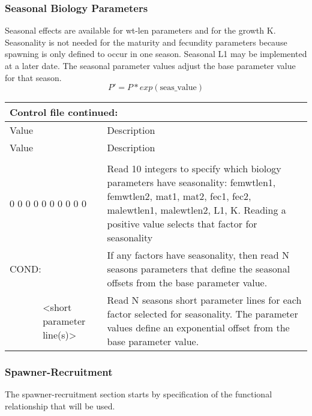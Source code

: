 \subsubsection{Seasonal Biology Parameters}
Seasonal effects are available for wt-len parameters and for the growth K.  Seasonality is not needed for the maturity and fecundity parameters because spawning is only defined to occur in one season.  Seasonal L1 may be implemented at a later date.  The seasonal parameter values adjust the base parameter value for that season.
\begin{equation}
P'=P*exp(\text{seas\_value})
\end{equation}

\begin{center}
	\begin{longtable}{p{0.5cm} p{3.7cm} p{11cm}}
		\multicolumn{3}{l}{Control file continued:}\\
		\hline
		Value & &  Description\\
		\hline
		\endfirsthead
		
		\hline
		Value & &  Description\\
		\hline
		\endhead
		
		\endfoot
		\endlastfoot
		\multicolumn{3}{l}{\#Seasonality for selected biology parameters (not a conditional input)}\\
		\multicolumn{2}{l}{0 0 0 0 0 0 0 0 0 0} & Read 10 integers to specify which biology parameters have seasonality:  femwtlen1, femwtlen2, mat1, mat2, fec1, fec2, malewtlen1, malewtlen2, L1, K.  Reading a positive value selects that factor for seasonality\\
		\hline
		\multicolumn{2}{l}{COND:} & If any factors have seasonality, then read N seasons parameters that define the seasonal offsets from the base parameter value.\\
		& <short parameter line(s)> & Read N seasons short parameter lines for each factor selected for seasonality.
		The parameter values define an exponential offset from the base parameter value.\\
		\hline

	\end{longtable}
\end{center}

\hypertarget{SRR}{} 
\subsubsection{Spawner-Recruitment}
The spawner-recruitment section starts by specification of the functional relationship that will be used.  


